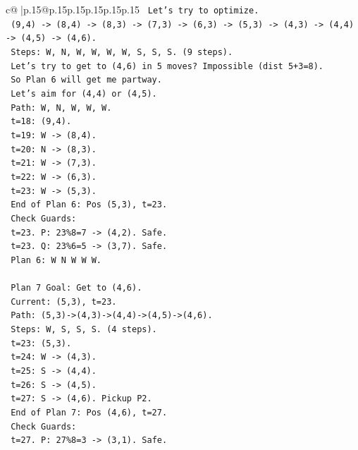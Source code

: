 \documentclass{article}
\begin{document}
{\begin{supertabular}{c@{$\;$}|p{.15\linewidth}@{}p{.15\linewidth}p{.15\linewidth}p{.15\linewidth}p{.15\linewidth}p{.15\linewidth}}
{{{\texttt{    Let's try to optimize.} \\
\texttt{    (9,4) {-}> (8,4) {-}> (8,3) {-}> (7,3) {-}> (6,3) {-}> (5,3) {-}> (4,3) {-}> (4,4) {-}> (4,5) {-}> (4,6).} \\
\texttt{    Steps: W, N, W, W, W, W, S, S, S. (9 steps).} \\
\texttt{    Let's try to get to (4,6) in 5 moves? Impossible (dist 5+3=8).} \\
\texttt{    So Plan 6 will get me partway.} \\
\texttt{    Let's aim for (4,4) or (4,5).} \\
\texttt{    Path: W, N, W, W, W.} \\
\texttt{    t=18: (9,4).} \\
\texttt{    t=19: W {-}> (8,4).} \\
\texttt{    t=20: N {-}> (8,3).} \\
\texttt{    t=21: W {-}> (7,3).} \\
\texttt{    t=22: W {-}> (6,3).} \\
\texttt{    t=23: W {-}> (5,3).} \\
\texttt{    End of Plan 6: Pos (5,3), t=23.} \\
\texttt{    Check Guards:} \\
\texttt{    t=23. P: 23\%8=7 {-}> (4,2). Safe.} \\
\texttt{    t=23. Q: 23\%6=5 {-}> (3,7). Safe.} \\
\texttt{    Plan 6: W N W W W.} \\
\\ 
\texttt{    Plan 7 Goal: Get to (4,6).} \\
\texttt{    Current: (5,3), t=23.} \\
\texttt{    Path: (5,3){-}>(4,3){-}>(4,4){-}>(4,5){-}>(4,6).} \\
\texttt{    Steps: W, S, S, S. (4 steps).} \\
\texttt{    t=23: (5,3).} \\
\texttt{    t=24: W {-}> (4,3).} \\
\texttt{    t=25: S {-}> (4,4).} \\
\texttt{    t=26: S {-}> (4,5).} \\
\texttt{    t=27: S {-}> (4,6). Pickup P2.} \\
\texttt{    End of Plan 7: Pos (4,6), t=27.} \\
\texttt{    Check Guards:} \\
\texttt{    t=27. P: 27\%8=3 {-}> (3,1). Safe.} \\
}}}
\end{supertabular}}
\end{document}
